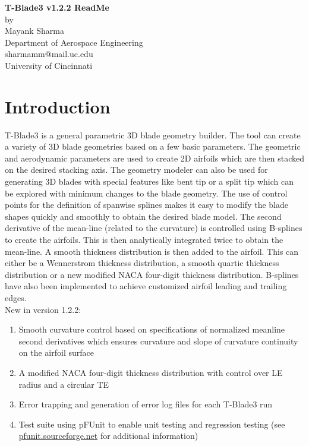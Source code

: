 \documentclass[8pt]{article}
\begin{document}
\begin{center}
\textbf{\large T-Blade3 v1.2.2 ReadMe}\\
by\\
Mayank Sharma\\
Department of Aerospace Engineering\\
sharmamm@mail.uc.edu\\
University of Cincinnati\\
[1cm]
\end{center}

\section{Introduction}
\noindent
T-Blade3 is a general parametric 3D blade geometry builder\cite{KiranPaper}. The tool can create a variety of 3D blade geometries based on a few basic parameters. The geometric and aerodynamic parameters are used to create 2D airfoils which are then stacked on the desired stacking axis\cite{KiranThesis}. The geometry modeler can also be  used for generating 3D blades with special features like bent tip or a split tip\cite{AbhayThesis} which can be explored with minimum changes to the blade geometry. The use of control points for the definition of spanwise splines makes it easy to modify the blade shapes quickly and smoothly to obtain the desired blade model\cite{SyedPaper}. The second derivative of the mean-line (related to the curvature) is controlled using B-splines to create the airfoils. This is then analytically integrated twice to obtain the mean-line\cite{AhmedPaper}. A smooth thickness distribution is then added to the airfoil. This can either be a Wennerstrom thickness distribution\cite{WennerstromBook}, a smooth quartic thickness distribution or a new modified NACA four-digit thickness distribution\cite{AbbottText}. B-splines have also been implemented to achieve customized airfoil leading and trailing edges.\\

\noindent
New in version 1.2.2:

\begin{enumerate}[leftmargin=*]
    \item Smooth curvature control based on specifications of normalized meanline second derivatives which ensures curvature and slope of curvature continuity on the airfoil surface
    \item A modified NACA four-digit thickness distribution with control over LE radius and a circular TE
    \item Error trapping and generation of error log files for each T-Blade3 run
    \item Test suite using pFUnit to enable unit testing and regression testing (see \url{pfunit.sourceforge.net} for additional information)
\end{enumerate}
\end{document}
